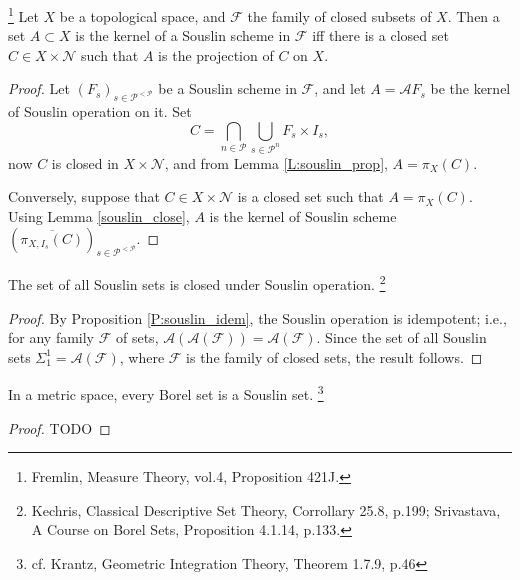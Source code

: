 \begin{proposition}
\footnote{Fremlin, Measure Theory, vol.4, Proposition 421J.}
Let $X$ be a topological space, and $\mathcal{F}$ the family of closed subsets
of $X$. Then a set $A\subset X$ is the kernel of a Souslin scheme in  
$\mathcal{F}$ iff there is a closed set $C\in X\times\mathcal{N}$ such that $A$
is the projection of $C$ on $X$.
\end{proposition}
\begin{proof}
Let $(F_s)_{s\in\mathcal{P}^{<\mathcal{P}}}$ be a Souslin scheme in
$\mathcal{F}$, and let $A=\mathcal{A} F_s$ be the kernel of Souslin operation 
on it. Set
\[
  C = \bigcap_{n\in\mathcal{P}} \bigcup_{s\in\mathcal{P}^n} F_s \times I_s,
\]
now $C$ is closed in $X\times\mathcal{N}$, and from Lemma \ref{L:souslin_prop},
$A=\pi_X(C)$.

Conversely, suppose that $C\in X\times\mathcal{N}$ is a closed set such that
$A=\pi_X(C)$. Using Lemma \ref{souslin_close}, $A$ is the kernel of Souslin
scheme $(\overline{\pi_{X,I_s}(C)})_{s\in\mathcal{P}^{<\mathcal{P}}}$.
\end{proof}

\begin{proposition}
The set of all Souslin sets is closed under Souslin operation.
  \footnote{
    Kechris, Classical Descriptive Set Theory, Corrollary 25.8, p.199;
    Srivastava, A Course on Borel Sets, Proposition 4.1.14, p.133.}
\end{proposition}
\begin{proof}
By Proposition \ref{P:souslin_idem}, the Souslin operation is idempotent; i.e.,
for any family $\mathcal{F}$ of sets, 
$\mathcal{A}(\mathcal{A}(\mathcal{F})) =\mathcal{A}(\mathcal{F})$. Since the set
of all Souslin sets $\Sigma_1^1=\mathcal{A}(\mathcal{F})$, where $\mathcal{F}$
is the family of closed sets, the result follows.
\end{proof}

\begin{proposition}
In a metric space, every Borel set is a Souslin set.
  \footnote{cf. Krantz, Geometric Integration Theory, Theorem 1.7.9, p.46}
\end{proposition}
\begin{proof}
TODO
\end{proof}






